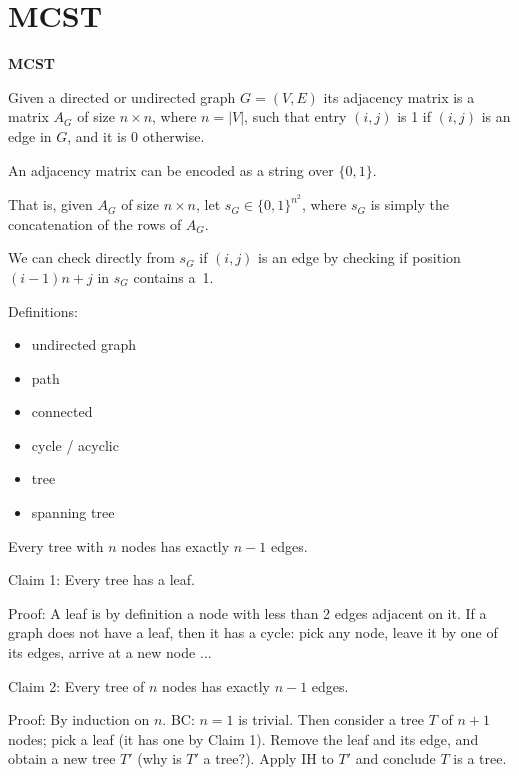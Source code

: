
\newcommand{\mytitle}{Greedy}
\newcommand{\mychpnr}{2}


\section{MCST}

\begin{frame}
{\bf MCST}

Given a directed or undirected graph $G=(V,E)$ its adjacency matrix is
a matrix $A_G$ of size $n\times n$, where $n=|V|$, such that entry
$(i,j)$ is 1 if $(i,j)$ is an edge in $G$, and it is 0 otherwise. 

An adjacency matrix can be encoded as a string over $\{0,1\}$.  

That is, given $A_G$ of size $n\times n$, let $s_G\in\{0,1\}^{n^2}$,
where $s_G$ is simply the concatenation of the rows of $A_G$.  

We can check directly from $s_G$ if $(i,j)$ is an edge by checking if
position $(i-1)n+j$ in $s_G$ contains a~1.
\end{frame}

\begin{frame}
Definitions:

\begin{itemize}
\item undirected graph
\item path
\item connected
\item cycle / acyclic
\item tree
\item spanning tree
\end{itemize}
\end{frame}

\begin{frame}
Every tree with $n$ nodes has exactly $n-1$ edges.

Claim 1: Every tree has a leaf.

Proof: A leaf is by definition a node with less than 2 edges adjacent
on it. If a graph does not have a leaf, then it has a cycle: pick any
node, leave it by one of its edges, arrive at a new node $\ldots$

Claim 2: Every tree of $n$ nodes has exactly $n-1$ edges.

Proof: By induction on $n$. BC: $n=1$ is trivial. Then consider a tree
$T$ of $n+1$ nodes; pick a leaf (it has one by Claim 1). Remove the
leaf and its edge, and obtain a new tree $T'$ (why is $T'$ a tree?).
Apply IH to $T'$ and conclude $T$ is a tree.
\end{frame}


